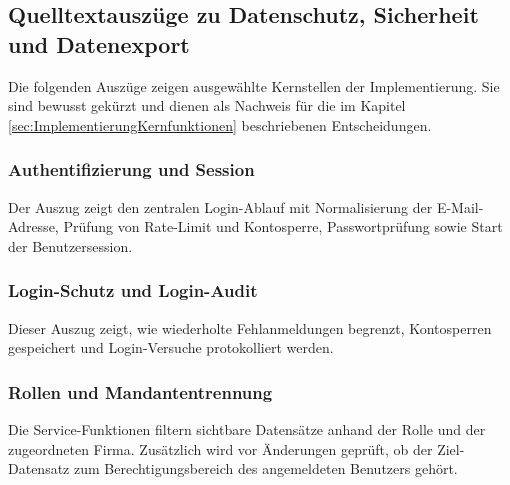 \subsection{Quelltextauszüge zu Datenschutz, Sicherheit und Datenexport}
\label{app:CodeAuthentifizierung}

Die folgenden Auszüge zeigen ausgewählte Kernstellen der Implementierung. Sie
sind bewusst gekürzt und dienen als Nachweis für die im Kapitel
\ref{sec:ImplementierungKernfunktionen} beschriebenen Entscheidungen.

\subsubsection*{Authentifizierung und Session}
Der Auszug zeigt den zentralen Login-Ablauf mit Normalisierung der
E-Mail-Adresse, Prüfung von Rate-Limit und Kontosperre, Passwortprüfung sowie
Start der Benutzersession.


\clearpage

\subsubsection*{Login-Schutz und Login-Audit}
Dieser Auszug zeigt, wie wiederholte Fehlanmeldungen begrenzt, Kontosperren
gespeichert und Login-Versuche protokolliert werden.


\clearpage

\subsubsection*{Rollen und Mandantentrennung}
Die Service-Funktionen filtern sichtbare Datensätze anhand der Rolle und der
zugeordneten Firma. Zusätzlich wird vor Änderungen geprüft, ob der Ziel-Datensatz
zum Berechtigungsbereich des angemeldeten Benutzers gehört.


\clearpage

